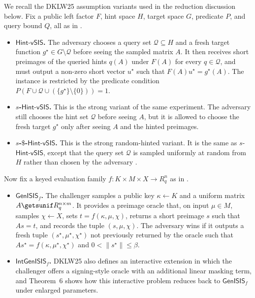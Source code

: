 \begin{definition}\label{def:dklw-assumptions}
We recall the DKLW25 assumption variants used in the reduction discussion below.
Fix a public left factor \(F\), hint space \(H\), target space \(G\), predicate \(P\), and query bound \(Q\), all as in
\cite[Definition~5]{EPRINT:DKLW25}.
\begin{itemize}[leftmargin=1.25em]
  \item \textbf{\(\mathsf{Hint\mbox{-}vSIS}\).} The adversary chooses a query set \(\mathcal{Q}\subseteq H\) and a fresh
  target function \(g^\star\in G\setminus \mathcal{Q}\) before seeing the sampled matrix \(A\). It then receives short
  preimages of the queried hints \(q(A)\) under \(F(A)\) for every \(q\in\mathcal{Q}\), and must output a non-zero short
  vector \(u^\star\) such that \(F(A)u^\star=g^\star(A)\). The instance is restricted by the predicate condition
  \(P(F\cup \mathcal{Q}\cup(\{g^\star\}\setminus\{0\}))=1\).
  \item \textbf{\(s\)-\(\mathsf{Hint\mbox{-}vSIS}\).} This is the strong variant of the same experiment. The adversary still
  chooses the hint set \(\mathcal{Q}\) before seeing \(A\), but it is allowed to choose the fresh target \(g^\star\) only
  after seeing \(A\) and the hinted preimages.
  \item \textbf{\(s\)-\(\$\)-\(\mathsf{Hint\mbox{-}vSIS}\).} This is the strong random-hinted variant. It is the same as
  \(s\)-\(\mathsf{Hint\mbox{-}vSIS}\), except that the query set \(\mathcal{Q}\) is sampled uniformly at random from \(H\)
  rather than chosen by the adversary \cite[Definition~5]{EPRINT:DKLW25}.
\end{itemize}

Now fix a keyed evaluation family \(f:K\times M\times X\to R_q^n\) as in \cite[Definition~8]{EPRINT:DKLW25}.
\begin{itemize}[leftmargin=1.25em]
  \item \textbf{\(\mathsf{GenISIS}_f\).} The challenger samples a public key \(\kappa\gets K\) and a uniform matrix
  \(A\getsunif R_q^{n\times m}\). It provides a preimage oracle that, on input \(\mu\in M\), samples \(\chi\gets X\),
  sets \(t=f(\kappa,\mu,\chi)\), returns a short preimage \(s\) such that \(As=t\), and records the tuple
  \((s,\mu,\chi)\). The adversary wins if it outputs a fresh tuple \((s^\star,\mu^\star,\chi^\star)\) not previously
  returned by the oracle such that \(As^\star=f(\kappa,\mu^\star,\chi^\star)\) and \(0<\|s^\star\|\le \beta\).
  \item \textbf{\(\mathsf{IntGenISIS}_f\).} DKLW25 also defines an interactive extension in which the challenger offers a
  signing-style oracle with an additional linear masking term, and Theorem~6 shows how this interactive problem reduces
  back to \(\mathsf{GenISIS}_f\) under enlarged parameters.
\end{itemize}
\end{definition}


